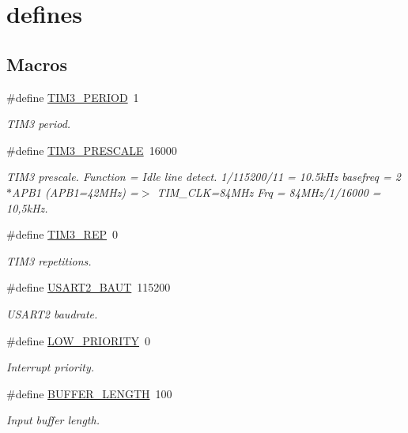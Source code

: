 \hypertarget{group___u_a_r_t}{}\section{defines}
\label{group___u_a_r_t}
\subsection*{Macros}
\begin{DoxyCompactItemize}
\item 
\#define \mbox{\hyperlink{group___u_a_r_t_ga440b2369d97666f7dd55447dc6085121}{T\+I\+M3\+\_\+\+P\+E\+R\+I\+OD}}~1
\begin{DoxyCompactList}\small\item\em T\+I\+M3 period. \end{DoxyCompactList}\item 
\#define \mbox{\hyperlink{group___u_a_r_t_ga8a8bca812ed15b484d996bd1ae2fe2b0}{T\+I\+M3\+\_\+\+P\+R\+E\+S\+C\+A\+LE}}~16000
\begin{DoxyCompactList}\small\item\em T\+I\+M3 prescale. Function = Idle line detect. 1/115200/11 = 10.\+5k\+Hz basefreq = 2$\ast$\+A\+P\+B1 (A\+P\+B1=42\+M\+Hz) =$>$ T\+I\+M\+\_\+\+C\+LK=84\+M\+Hz Frq = 84\+M\+Hz/1/16000 = 10,5k\+Hz. \end{DoxyCompactList}\item 
\#define \mbox{\hyperlink{group___u_a_r_t_ga532c634753a005c2474ea535f4374c0d}{T\+I\+M3\+\_\+\+R\+EP}}~0
\begin{DoxyCompactList}\small\item\em T\+I\+M3 repetitions. \end{DoxyCompactList}\item 
\#define \mbox{\hyperlink{group___u_a_r_t_ga4155a38b0821ffbb7621dfb91213dcd0}{U\+S\+A\+R\+T2\+\_\+\+B\+A\+UT}}~115200
\begin{DoxyCompactList}\small\item\em U\+S\+A\+R\+T2 baudrate. \end{DoxyCompactList}\item 
\#define \mbox{\hyperlink{group___u_a_r_t_ga9b470dff68ba3321209a33edc4638bd8}{L\+O\+W\+\_\+\+P\+R\+I\+O\+R\+I\+TY}}~0
\begin{DoxyCompactList}\small\item\em Interrupt priority. \end{DoxyCompactList}\item 
\#define \mbox{\hyperlink{group___u_a_r_t_gaf7b7dc9a200cb1404c280bd500fd1551}{B\+U\+F\+F\+E\+R\+\_\+\+L\+E\+N\+G\+TH}}~100
\begin{DoxyCompactList}\small\item\em Input buffer length. \end{DoxyCompactList}\end{DoxyCompactItemize}


